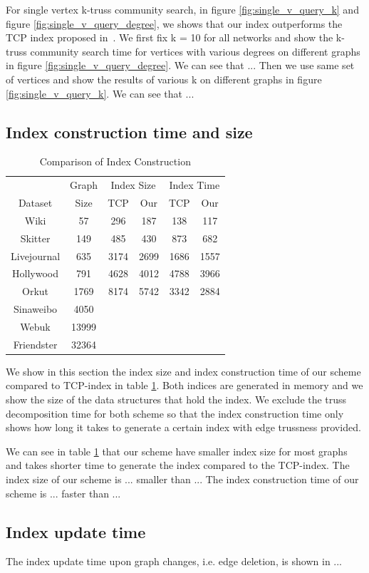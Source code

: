 For single vertex k-truss community search, in figure \ref{fig:single_v_query_k} and figure \ref{fig:single_v_query_degree}, we shows that our index outperforms the TCP index proposed in~\cite{huang2014querying}. We first fix k = 10 for all networks and show the k-truss community search time for vertices with various degrees on different graphs in figure \ref{fig:single_v_query_degree}. We can see that ... Then we use same set of vertices and show the results of various k on different graphs in figure \ref{fig:single_v_query_k}. We can see that ...
 
\subsection{Index construction time and size}
\label{eval_const}

\begin{table}
		\caption{Comparison of Index Construction}
		\vspace{2 mm}
		\label{table:index_construction}
		\centering
		\begin{tabular}{|c|c|cc|cc|} \hline 
			 & Graph & \multicolumn{2}{|c|}{Index Size} & \multicolumn{2}{|c}{Index Time} \\
			\cline{3-6}
			Dataset & Size & TCP  & Our & TCP & Our \\ \hline
			Wiki & 57 & 296 & 187 & 138 & 117\\ 
			Skitter & 149 & 485 & 430 & 873 & 682\\ 
			Livejournal & 635 & 3174 & 2699 & 1686 & 1557\\ 
			Hollywood & 791 & 4628 & 4012 & 4788 & 3966\\ 
			Orkut & 1769 & 8174 & 5742 & 3342 & 2884\\ 
			Sinaweibo & 4050 &  &  &  & \\ 
			Webuk & 13999 &   &  &  & \\ 
			Friendster & 32364 &   &  &  & \\ \hline
		\end{tabular}
\end{table}

We show in this section the index size and index construction time of our scheme compared to TCP-index in 
table \ref{table:index_construction}. Both indices are generated in memory and we show the size of the data structures that hold the index. We exclude the truss decomposition time for both scheme so that the index construction time only shows how long it takes to generate a certain index with edge trussness provided. 

We can see in table \ref{table:index_construction} that our scheme have smaller index size for most graphs and takes shorter time to generate the index compared to the TCP-index. The index size of our scheme is ... smaller than ...  The index construction time of our scheme is ... faster than ...

\subsection{Index update time}
\label{eval_update}

The index update time upon graph changes, i.e. edge deletion, is shown in ... 


